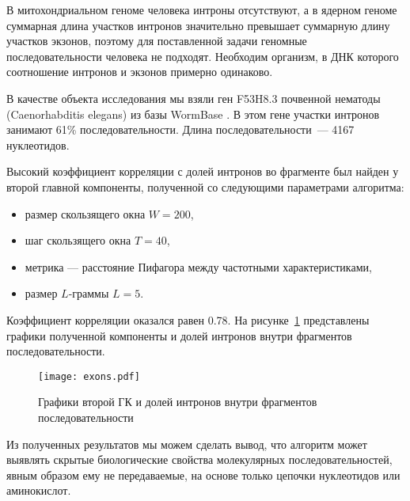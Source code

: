 В митохондриальном геноме человека интроны отсутствуют, а в ядерном геноме суммарная длина участков интронов значительно превышает суммарную длину участков экзонов, поэтому для поставленной задачи геномные последовательности человека не подходят. Необходим организм, в ДНК которого соотношение интронов и экзонов примерно одинаково.

В качестве объекта исследования мы взяли ген F53H8.3 почвенной нематоды (Caenorhabditis elegans) из базы WormBase \cite{Harris2003}. В этом гене участки интронов занимают 61\% последовательности. Длина последовательности~--- 4167 нуклеотидов.

Высокий коэффициент корреляции с долей интронов во фрагменте был найден у второй главной компоненты, полученной со следующими параметрами алгоритма:

\begin{itemize}
  \item размер скользящего окна $W = 200$,
  \item шаг скользящего окна $T = 40$,
  \item метрика --- расстояние Пифагора между частотными характеристиками,
  \item размер $L$-граммы $L = 5$.
\end{itemize}

Коэффициент корреляции оказался равен 0.78. На рисунке~\ref{exons} представлены графики полученной компоненты и долей интронов внутри фрагментов последовательности.

\begin{figure}[!t]
  \centering
  \texttt{[image: exons.pdf]}
  \caption{Графики второй ГК и долей интронов внутри фрагментов последовательности}
  \label{exons}
\end{figure}

Из полученных результатов мы можем сделать вывод, что алгоритм может выявлять скрытые биологические свойства молекулярных последовательностей, явным образом ему не передаваемые, на основе только цепочки нуклеотидов или аминокислот.
